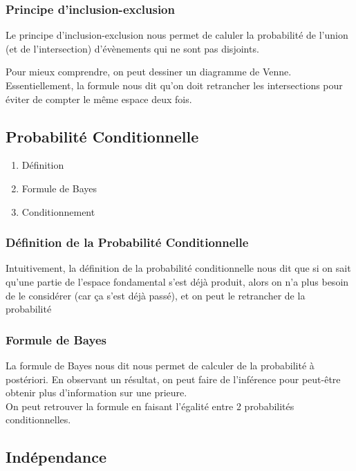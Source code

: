 \documentclass{article}
\begin{document}
\subsubsection{Principe d'inclusion-exclusion}%
\label{ssub:Principe d'inclusion-exclusion}

Le principe d'inclusion-exclusion nous permet de caluler la probabilité
de l'union (et de l'intersection) d'évènements qui ne sont pas disjoints.

Pour mieux comprendre, on peut dessiner un diagramme de Venne. Essentiellement, la formule nous dit qu'on doit retrancher les intersections pour éviter
de compter le même espace deux fois.

\subsection{Probabilité Conditionnelle}

\begin{enumerate}
    \item Définition
    \item Formule de Bayes
    \item Conditionnement
\end{enumerate}


\subsubsection{Définition de la Probabilité Conditionnelle}%
\label{ssub:Définition de la Probabilité Conditionnelle}

Intuitivement, la définition de la probabilité conditionnelle nous dit
que si on sait qu'une partie de l'espace fondamental s'est déjà produit,
alors on n'a plus besoin de le considérer (car ça s'est déjà passé), et
on peut le retrancher de la probabilité

\subsubsection{Formule de Bayes}%
\label{ssub:Formule de Bayes}

La formule de Bayes nous dit nous permet de calculer de la probabilité
à postériori. En observant un résultat, on peut faire de l'inférence pour
peut-être obtenir plus d'information sur une prieure.\\

On peut retrouver la formule en faisant l'égalité entre 2 probabilités
conditionnelles.

\subsection{Indépendance}
\end{document}
